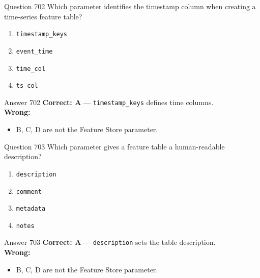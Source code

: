\documentclass[aspectratio=169,11pt]{beamer}
\begin{document}
	\begin{frame}{Question 702}
		Which parameter identifies the timestamp column when creating a time-series feature table?
		\begin{enumerate}[label=\Alph*.]
			\item \texttt{timestamp\_keys}
			\item \texttt{event\_time}
			\item \texttt{time\_col}
			\item \texttt{ts\_col}
		\end{enumerate}
	\end{frame}
	\begin{frame}{Answer 702}
		\textbf{Correct: A} --- \texttt{timestamp\_keys} defines time columns.\\
		\vspace{0.5em}
		\textbf{Wrong:}
		\begin{itemize}
			\item B, C, D are not the Feature Store parameter.
		\end{itemize}
	\end{frame}
	
	\begin{frame}{Question 703}
		Which parameter gives a feature table a human-readable description?
		\begin{enumerate}[label=\Alph*.]
			\item \texttt{description}
			\item \texttt{comment}
			\item \texttt{metadata}
			\item \texttt{notes}
		\end{enumerate}
	\end{frame}
	\begin{frame}{Answer 703}
		\textbf{Correct: A} --- \texttt{description} sets the table description.\\
		\vspace{0.5em}
		\textbf{Wrong:}
		\begin{itemize}
			\item B, C, D are not the Feature Store parameter.
		\end{itemize}
	\end{frame}
	
\end{document}
